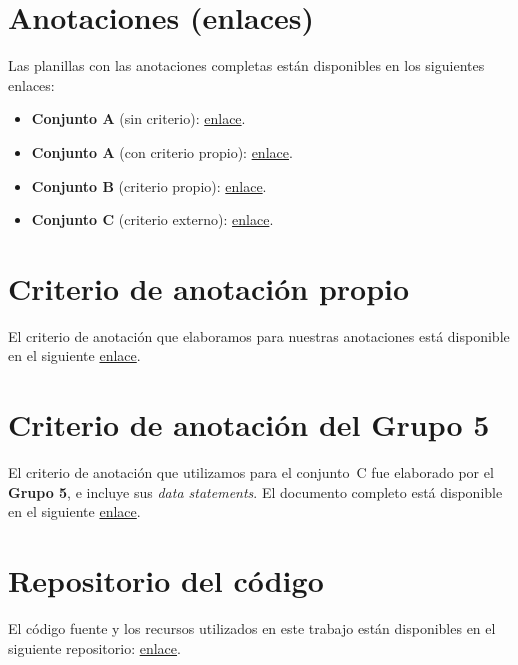 \section{Anotaciones (enlaces)}
\label{ap:anotaciones}

Las planillas con las anotaciones completas están disponibles en los siguientes
enlaces:
\begin{itemize}
  \item \textbf{Conjunto A} (sin criterio):
    \href{https://docs.google.com/spreadsheets/d/1sNausxIyKAkPQqZLzBhwwcWVJZw6RVvCREiOsXESHJA/edit?gid=197319219\#gid=197319219}{enlace}.
  \item \textbf{Conjunto A} (con criterio propio):
    \href{https://docs.google.com/spreadsheets/d/10D6LHwRfZ-UI1jfoNbYCG6vAj-GPCtuhSARlbtt4Iwo/edit?gid=239714396\#gid=239714396}{enlace}.
  \item \textbf{Conjunto B} (criterio propio):
    \href{https://docs.google.com/spreadsheets/d/1RuGaMAdIc9IuWvecUwBUUF0Egr-905_fVvoCKso3fWE/edit?gid=741315237\#gid=741315237}{enlace}.
  \item \textbf{Conjunto C} (criterio externo):
    \href{https://docs.google.com/spreadsheets/d/1l7rSK5nfPkUuYa_YYcUt0vB9ZpxL_bLsJTQWG82fqlQ/edit?gid=1957930832\#gid=1957930832}{enlace}.
\end{itemize}

\section{Criterio de anotación propio}
\label{ap:criterio-propio}

El criterio de anotación que elaboramos para nuestras anotaciones está disponible
en el siguiente
\href{https://docs.google.com/document/d/1JG2x4rbewVhSCePUoBqNxGtc-N32f5pgbmxsg5gMczc/edit?usp=sharing}{enlace}.

\section{Criterio de anotación del Grupo 5}
\label{ap:grupo5}

El criterio de anotación que utilizamos para el conjunto~C fue elaborado por el
\textbf{Grupo 5}, e incluye sus \emph{data statements}. El documento completo está
disponible en el siguiente
\href{https://docs.google.com/document/d/1Co46FXr84AO58-tkjrJ2dXcE24cIRmJLm_49kQVsot8/edit?tab=t.0}{enlace}.

\section{Repositorio del código}
\label{ap:repositorio}

El código fuente y los recursos utilizados en este trabajo están disponibles en el
siguiente repositorio:
\href{https://github.com/JuanCruzMendoza/temas_NLP_TP}{enlace}.
